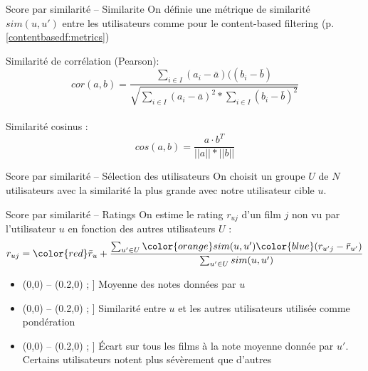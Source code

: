 \begin{frame}{Score par similarité -- Similarite}
  \label{collabf:sim_user}
  On définie une métrique de similarité $sim(u,u')$ entre les utilisateurs comme pour le content-based filtering (p.\ref{contentbasedf:metrics}) 

  \alert{Similarité de corrélation (Pearson)}:\\
    $$cor(a,b)=\frac{ \sum_{i \in I} (a_i - \bar{a})((b_i - \bar{b})}{\sqrt{\sum_{i \in I} (a_i - \bar{a})^2*\sum_{i \in I} (b_i - \bar{b})^2}}$$ \\
  \alert{Similarité cosinus} :\\
    $$cos(a,b)=\frac{a\cdot b^T}{||a||*||b||}$$
  
\end{frame}

\begin{frame}{Score par similarité -- Sélection des utilisateurs}
  \label{collabf:select_users}
  On choisit un groupe $U$ de $N$ utilisateurs avec la similarité la plus grande avec notre utilisateur cible $u$.
\end{frame}

\newcommand{\colorline}[1]{%
  \tikz
    \draw[#1 ,very thick] (0,0) -- (0.2,0) ;%
}
\begin{frame}{Score par similarité -- Ratings}
  \label{collabf:rating_sim}
  On estime le rating $r_{uj}$ d'un film $j$ non vu par l'utilisateur $u$ en fonction des autres utilisateurs $U$ :
  $$
    r_{uj} = {\color{red}\bar{r}_u} + \frac{\sum_{u' \in U} {\color{orange} sim(u,u')} {\color{blue}(r_{u'j} - \bar{r}_{u'})}}{\sum_{u' \in U} sim(u,u')}
  $$
  \begin{minipage}[t]{0.49\linewidth}
    \begin{itemize}
      \item[\colorline{red}] Moyenne des notes données par $u$
      \item[\colorline{orange}] Similarité entre $u$ et les autres utilisateurs utilisée comme pondération
    \end{itemize}
  \end{minipage}
  \begin{minipage}[t]{0.49\linewidth}
    \begin{itemize}
      \item[\colorline{blue}] Écart sur tous les films à la note moyenne donnée par $u'$. Certains utilisateurs notent plus sévèrement que d'autres
    \end{itemize}
  \end{minipage}
  
\end{frame}

